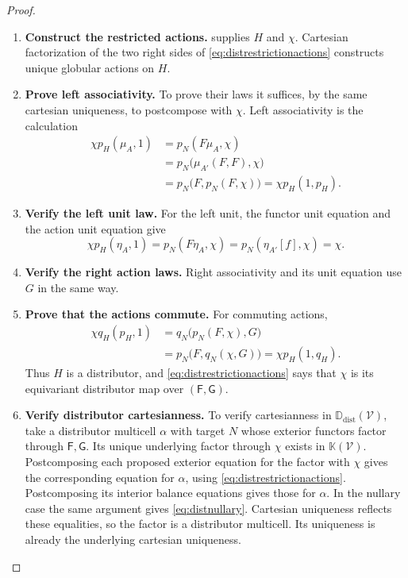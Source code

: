 \documentclass[11pt,reqno]{amsart}
\theoremstyle{plain}
\theoremstyle{definition}
\theoremstyle{remark}
\numberwithin{equation}{section}
\newcommand{\V}{\mathcal V}
\newcommand{\Kcal}{\mathbb K}
\newcommand{\Ddist}{\mathbb D_{\mathrm{dist}}}
\begin{document}
\begin{proof}\leavevmode
\begin{enumerate}
\item \textbf{Construct the restricted actions.}  supplies $H$ and $\chi$.
Cartesian factorization of the two right sides of
\cref{eq:distrestrictionactions} constructs unique globular actions
on $H$.

\item \textbf{Prove left associativity.} To prove their laws it suffices, by the same cartesian
uniqueness, to postcompose with $\chi$. Left associativity is the
calculation
\begin{align*}
 \chi p_H(\mu_A,1)
 &=p_N(F\mu_A,\chi)\\
 &=p_N\bigl(\mu_{A'}(F,F),\chi\bigr)\\
 &=p_N\bigl(F,p_N(F,\chi)\bigr)
 =\chi p_H(1,p_H).
\end{align*}

\item \textbf{Verify the left unit law.} For the left unit, the functor unit equation and the action unit equation
give
\[
 \chi p_H(\eta_A,1)
 =p_N(F\eta_A,\chi)
 =p_N(\eta_{A'}[f],\chi)=\chi.
\]

\item \textbf{Verify the right action laws.} Right associativity and its unit equation use $G$ in the same way.

\item \textbf{Prove that the actions commute.} For commuting actions,
\begin{align*}
 \chi q_H(p_H,1)
 &=q_N\bigl(p_N(F,\chi),G\bigr)\\
 &=p_N\bigl(F,q_N(\chi,G)\bigr)
 =\chi p_H(1,q_H).
\end{align*}
Thus $H$ is a distributor, and \cref{eq:distrestrictionactions} says
that $\chi$ is its equivariant distributor map over
$(\mathsf F,\mathsf G)$.

\item \textbf{Verify distributor cartesianness.} To verify cartesianness in $\Ddist(\V)$, take a distributor multicell
$\alpha$ with target $N$ whose exterior functors factor through
$\mathsf F,\mathsf G$. Its unique underlying factor through $\chi$
exists in $\Kcal(\V)$. Postcomposing each proposed exterior equation
for the factor with $\chi$ gives the corresponding equation for
$\alpha$, using \cref{eq:distrestrictionactions}. Postcomposing its
interior balance equations gives those for $\alpha$. In the nullary
case the same argument gives \cref{eq:distnullary}. Cartesian uniqueness
reflects these equalities, so the factor is a distributor multicell.
Its uniqueness is already the underlying cartesian uniqueness.


\end{enumerate}
\end{proof}
\end{document}
